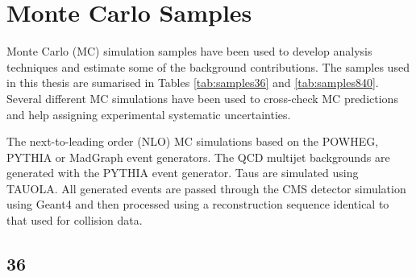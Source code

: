 \chapter{Monte Carlo Samples }
Monte Carlo (MC) simulation samples have been used to develop analysis
techniques and estimate some of the background contributions. 
The samples used in this thesis are sumarised in Tables \ref{tab:samples36} and
\ref{tab:samples840}.  Several different MC simulations have been used to cross-check MC
predictions and help assigning experimental systematic uncertainties.

The next-to-leading order (NLO) MC simulations based on the
{POWHEG}\cite{powheg}, {PYTHIA}\cite{pythia} or {MadGraph}\cite{madgraph} event
generators.  
The QCD multijet backgrounds are generated with the {PYTHIA} event generator.
Taus are simulated using {TAUOLA}\cite{tauola}.  
All generated events are passed through the CMS detector simulation using
{Geant4} \cite{geant} and then processed using a reconstruction sequence
identical to that used for collision data. 

\newpage
\section{\unit{36}{\invpb}}

